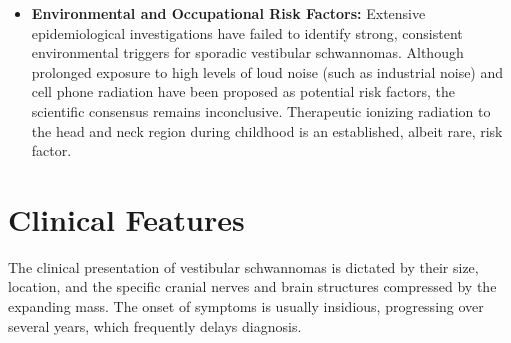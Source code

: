 \begin{itemize}
    \item \textbf{Environmental and Occupational Risk Factors:} Extensive epidemiological investigations have failed to identify strong, consistent environmental triggers for sporadic vestibular schwannomas. Although prolonged exposure to high levels of loud noise (such as industrial noise) and cell phone radiation have been proposed as potential risk factors, the scientific consensus remains inconclusive. Therapeutic ionizing radiation to the head and neck region during childhood is an established, albeit rare, risk factor.
\end{itemize}

\section*{Clinical Features}
The clinical presentation of vestibular schwannomas is dictated by their size, location, and the specific cranial nerves and brain structures compressed by the expanding mass. The onset of symptoms is usually insidious, progressing over several years, which frequently delays diagnosis.
